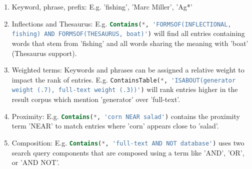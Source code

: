\begin{enumerate}
    \item Keyword, phrase, prefix: E.g. 'fishing', 'Marc Miller', 'Ag*'
    \item Inflections and Thesaurus: E.g. \lstinline[language=SQL]$Contains(*, 'FORMSOF(INFLECTIONAL, fishing) AND FORMSOF(THESAURUS, boat)')$ will find all entries containing words that stem from 'fishing' and all words sharing the meaning with 'boat' (Thesaurus support).
    \item Weighted terms: Keywords and phrases can be assigned a relative weight to impact the rank of entries. E.g. \lstinline[language=SQL]$ContainsTable(*, 'ISABOUT(generator weight (.7), full-text weight (.3))')$ will rank entries higher in the result corpus which mention 'generator' over 'full-text'.
    \item Proximity: E.g. \lstinline[language=SQL]$Contains(*, 'corn NEAR salad')$ contains the proximity term 'NEAR' to match entries where 'corn' appears close to 'salad'.
    \item Composition: E.g. \lstinline[language=SQL]$Contains(*, 'full-text AND NOT database')$ uses two search query components that are composed using a term like 'AND', 'OR', or 'AND NOT'.
\end{enumerate}
